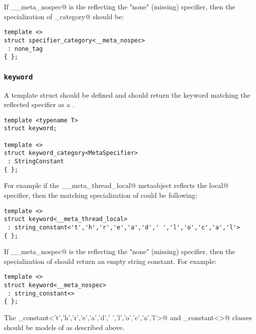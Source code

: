 If \verb@__meta_nospec@ is the  reflecting the "none" (missing) specifier,
then the specialization of \verb@specifier_category@ should be:

\begin{verbatim}
template <>
struct specifier_category<__meta_nospec>
 : none_tag
{ };
\end{verbatim}


\subsubsection{\texttt{keyword}}

A template struct \verb@keyword@ should be defined and should return
the keyword matching the reflected specifier as a
.

\begin{verbatim}
template <typename T>
struct keyword;

template <>
struct keyword_category<MetaSpecifier>
 : StringConstant
{ };
\end{verbatim}

For example if the \verb@__meta_thread_local@ metaobject reflects the \verb@thread local@
specifier, then the matching specialization of \verb@keyword@ could be following:

\begin{verbatim}
template <>
struct keyword<__meta_thread_local>
 : string_constant<'t','h','r','e','a','d',' ','l','o','c','a','l'>
{ };
\end{verbatim}

If \verb@__meta_nospec@ is the  reflecting the "none" (missing) specifier,
then the specialization of \verb@keyword@ should return an empty string constant.
For example:

\begin{verbatim}
template <>
struct keyword<__meta_nospec>
 : string_constant<>
{ };
\end{verbatim}

The \verb@string_constant<'t','h','r','e','a','d',' ','l','o','c','a','l'>@
and \verb@string_constant<>@ classes should be models of 
as described above.

